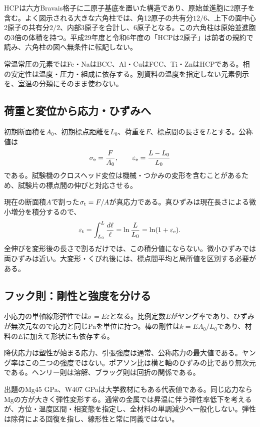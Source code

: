 HCPは六方Bravais格子に二原子基底を置いた構造であり、原始並進胞に2原子を含む。よく図示される大きな六角柱では、角12原子の共有分\(12/6\)、上下の面中心2原子の共有分\(2/2\)、内部3原子を合計し、6原子となる。この六角柱は原始並進胞の3倍の体積を持つ。平成29年度と令和6年度の「HCPは2原子」は前者の規約で読み、六角柱の図へ無条件に転記しない。

常温常圧の元素ではFe・NaはBCC、Al・CuはFCC、Ti・ZnはHCPである\cite{princeton_iron,princeton_sodium,princeton_aluminum,princeton_copper,princeton_titanium,princeton_zinc}。相の安定性は温度・圧力・組成に依存する。別資料の温度を指定しない元素例示を、室温の分類にそのまま使わない。

\subsection{荷重と変位から応力・ひずみへ}
\label{theory:material:tension}
初期断面積を\(A_0\)、初期標点距離を\(L_0\)、荷重を\(F\)、標点間の長さを\(L\)とする。公称値は
\[
 \sigma_{\rm e}=\frac{F}{A_0},\qquad
 \varepsilon_{\rm e}=\frac{L-L_0}{L_0}
\]
である。試験機のクロスヘッド変位は機械・つかみの変形を含むことがあるため、試験片の標点間の伸びと対応させる。

現在の断面積\(A\)で割った\(\sigma_{\rm t}=F/A\)が真応力である。真ひずみは現在長さによる微小増分を積分するので、
\[
 \varepsilon_{\rm t}=\int_{L_0}^{L}\frac{d\ell}{\ell}
 =\ln\frac{L}{L_0}=\ln(1+\varepsilon_{\rm e}).
\]
全伸びを変形後の長さで割るだけでは、この積分値にならない\cite{mit_material_stressstrain2001}。微小ひずみでは両ひずみは近い。大変形・くびれ後には、標点間平均と局所値を区別する必要がある。

\subsection{フック則：剛性と強度を分ける}
\label{theory:material:elasticity}
小応力の単軸線形弾性では\(\sigma=E\varepsilon\)となる。比例定数\(E\)がヤング率であり、ひずみが無次元なので応力と同じPaを単位に持つ。棒の剛性は\(k=EA_0/L_0\)であり、材料の\(E\)に加えて形状にも依存する\cite{mit_material_elastic2000}。

降伏応力は塑性が始まる応力、引張強度は通常、公称応力の最大値である。ヤング率はこの二つの強度ではない。ポアソン比は横と軸のひずみの比であり無次元である。ヘンリー則は溶解、ブラッグ則は回折の関係である。

出題のMg45 GPa、W407 GPaは大学教材にもある代表値である\cite{princeton_magnesium,princeton_tungsten}。同じ応力ならMgの方が大きく弾性変形する。通常の金属では昇温に伴う弾性率低下を考えるが、方位・温度区間・相変態を指定し、全材料の単調減少へ一般化しない。弾性は除荷による回復を指し、線形性と常に同義ではない。


